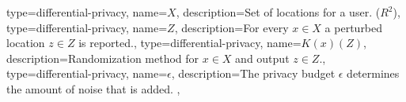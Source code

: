 
{
  type=differential-privacy,
  name={$\ensuremath{X} $},
  description={Set of locations for a user. ($R^2$)},
}
{
  type=differential-privacy,
  name={$\ensuremath{Z} $},
  description={For every $x \in X$ a perturbed location $z \in Z$ is reported.},
}
{
  type=differential-privacy,
  name={$K(x)(Z)$},
  description={Randomization method for $x \in X$ and output $z \in Z$.},
}
{
  type=differential-privacy,
  name={$\ensuremath{\epsilon} $},
  description={The privacy budget $\epsilon$ determines the amount of noise that is added.
    },
}

